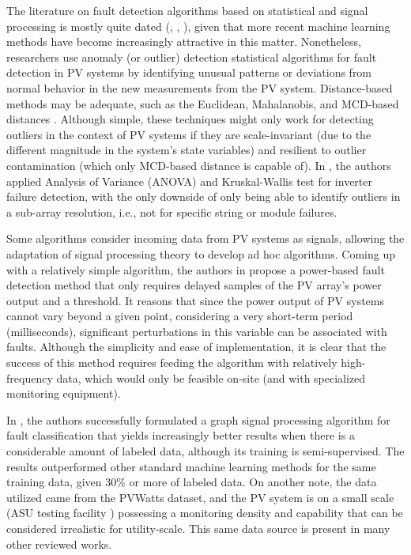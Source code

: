 The literature on fault detection algorithms based on statistical and signal processing is mostly quite dated (\cite{Buddha2012}, \cite{Zhao2014}, \cite{Vergura2008}), given that more recent machine learning methods have become increasingly attractive in this matter. Nonetheless, researchers use anomaly (or outlier) detection statistical algorithms for fault detection in PV systems by identifying unusual patterns or deviations from normal behavior in the new measurements from the PV system. Distance-based methods may be adequate, such as the Euclidean, Mahalanobis, and MCD-based distances \cite{Braun2011}. Although simple, these techniques might only work for detecting outliers in the context of PV systems if they are scale-invariant (due to the different magnitude in the system's state variables) and resilient to outlier contamination (which only MCD-based distance is capable of). In \cite{Vergura2008}, the authors applied Analysis of Variance (ANOVA) and Kruskal-Wallis test for inverter failure detection, with the only downside of only being able to identify outliers in a sub-array resolution, i.e., not for specific string or module failures.

Some algorithms consider incoming data from PV systems as signals, allowing the adaptation of signal processing theory to develop ad hoc algorithms. Coming up with a relatively simple algorithm, the authors in \cite{Iles2021} propose a power-based fault detection method that only requires delayed samples of the PV array's power output and a threshold. It reasons that since the power output of PV systems cannot vary beyond a given point, considering a very short-term period (milliseconds), significant perturbations in this variable can be associated with faults. Although the simplicity and ease of implementation, it is clear that the success of this method requires feeding the algorithm with relatively high-frequency data, which would only be feasible on-site (and with specialized monitoring equipment).

In \cite{Fan2020}, the authors successfully formulated a graph signal processing algorithm for fault classification that yields increasingly better results when there is a considerable amount of labeled data, although its training is semi-supervised. The results outperformed other standard machine learning methods for the same training data, given 30\% or more of labeled data. On another note, the data utilized came from the PVWatts \cite{Dobos2013} dataset, and the PV system is on a small scale (ASU testing facility \cite{Rao2016}) possessing a monitoring density and capability that can be considered irrealistic for utility-scale. This same data source is present in many other reviewed works.

